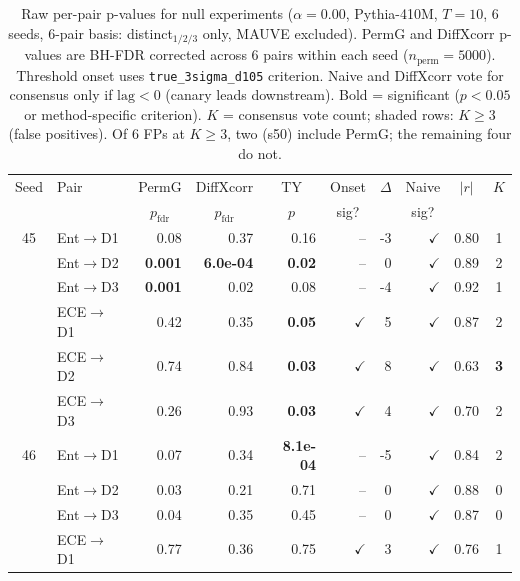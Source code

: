 \begin{table}[t]
\centering
\caption{Raw per-pair p-values for null experiments ($\alpha{=}0.00$, Pythia-410M, $T{=}10$, 6 seeds, 6-pair basis: distinct$_{1/2/3}$ only, MAUVE excluded).
PermG and DiffXcorr p-values are BH-FDR corrected across 6 pairs within each seed ($n_\text{perm}{=}5000$).
Threshold onset uses \texttt{true\_3sigma\_d105} criterion.
Naive and DiffXcorr vote for consensus only if $\text{lag} < 0$ (canary leads downstream).
Bold = significant ($p < 0.05$ or method-specific criterion).
$K$ = consensus vote count; shaded rows: $K \geq 3$ (false positives).
Of 6 FPs at $K{\geq}3$, two (s50) include PermG; the remaining four do not.}
\label{tab:fpr_transparency}
\small
\setlength{\tabcolsep}{3.5pt}
\begin{tabular}{cl rrr rr rr c}
\toprule
Seed & Pair & \multicolumn{1}{c}{PermG} & \multicolumn{1}{c}{DiffXcorr} & \multicolumn{1}{c}{TY} & \multicolumn{1}{c}{Onset} & \multicolumn{1}{c}{$\Delta$} & \multicolumn{1}{c}{Naive} & \multicolumn{1}{c}{$|r|$} & $K$ \\
 & & \multicolumn{1}{c}{$p_\text{fdr}$} & \multicolumn{1}{c}{$p_\text{fdr}$} & \multicolumn{1}{c}{$p$} & \multicolumn{1}{c}{sig?} & & \multicolumn{1}{c}{sig?} & & \\
\midrule
45 & Ent$\to$D1 & 0.08 & 0.37 & 0.16 & -- & -3 & $\checkmark$ & 0.80 & 1 \\
 & Ent$\to$D2 & \textbf{0.001} & \textbf{6.0e-04} & \textbf{0.02} & -- & 0 & $\checkmark$ & 0.89 & 2 \\
 & Ent$\to$D3 & \textbf{0.001} & 0.02 & 0.08 & -- & -4 & $\checkmark$ & 0.92 & 1 \\
 & ECE$\to$D1 & 0.42 & 0.35 & \textbf{0.05} & $\checkmark$ & 5 & $\checkmark$ & 0.87 & 2 \\
\rowcolor{gray!15}  & ECE$\to$D2 & 0.74 & 0.84 & \textbf{0.03} & $\checkmark$ & 8 & $\checkmark$ & 0.63 & \textbf{3} \\
 & ECE$\to$D3 & 0.26 & 0.93 & \textbf{0.03} & $\checkmark$ & 4 & $\checkmark$ & 0.70 & 2 \\
\midrule
46 & Ent$\to$D1 & 0.07 & 0.34 & \textbf{8.1e-04} & -- & -5 & $\checkmark$ & 0.84 & 2 \\
 & Ent$\to$D2 & 0.03 & 0.21 & 0.71 & -- & 0 & $\checkmark$ & 0.88 & 0 \\
 & Ent$\to$D3 & 0.04 & 0.35 & 0.45 & -- & 0 & $\checkmark$ & 0.87 & 0 \\
 & ECE$\to$D1 & 0.77 & 0.36 & 0.75 & $\checkmark$ & 3 & $\checkmark$ & 0.76 & 1 \\

\end{tabular}
\end{table}
